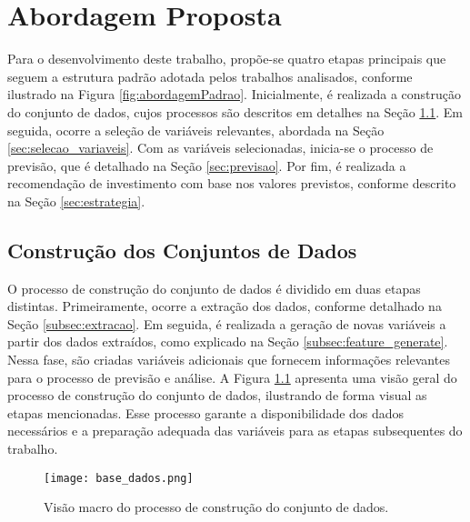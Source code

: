 \chapter{Abordagem Proposta}
\label{cap:abordagem_proposta}

Para o desenvolvimento deste trabalho, propõe-se quatro etapas principais que seguem a estrutura padrão adotada pelos trabalhos analisados, conforme ilustrado na Figura \ref{fig:abordagemPadrao}. Inicialmente, é realizada a construção do conjunto de dados, cujos processos são descritos em detalhes na Seção \ref{sec:base_dados}. Em seguida, ocorre a seleção de variáveis relevantes, abordada na Seção \ref{sec:selecao_variaveis}. Com as variáveis selecionadas, inicia-se o processo de previsão, que é detalhado na Seção \ref{sec:previsao}. Por fim, é realizada a recomendação de investimento com base nos valores previstos, conforme descrito na Seção \ref{sec:estrategia}. 

\section{Construção dos Conjuntos de Dados}
\label{sec:base_dados}
O processo de construção do conjunto de dados é dividido em duas etapas distintas. Primeiramente, ocorre a extração dos dados, conforme detalhado na Seção \ref{subsec:extracao}. Em seguida, é realizada a geração de novas variáveis a partir dos dados extraídos, como explicado na Seção \ref{subsec:feature_generate}. Nessa fase, são criadas variáveis adicionais que fornecem informações relevantes para o processo de previsão e análise. A Figura \ref{fig:base_dados} apresenta uma visão geral do processo de construção do conjunto de dados, ilustrando de forma visual as etapas mencionadas. Esse processo garante a disponibilidade dos dados necessários e a preparação adequada das variáveis para as etapas subsequentes do trabalho.

\begin{figure}[htbp]
    \caption{Visão macro do processo de construção do conjunto de dados.}
      \centering
    \texttt{[image: base\_dados.png]} 
    \label{fig:base_dados}
\end{figure}


